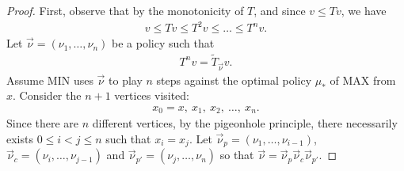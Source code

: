 \documentclass{article}
\begin{document}
\begin{proof}
  First, observe that by the monotonicity of $T$, and since $v \le Tv$, we have
  \begin{align}
    v \le Tv \le T^2 v \le \dots \le T^n v.
  \end{align}
  Let $\vec\nu=(\nu_1,\dots,\nu_n)$ be a policy such that
  \begin{align}
    T^n v = \tilde T_{\vec\nu} v.
  \end{align}
  Assume MIN uses $\vec\nu$ to play $n$ steps against the optimal policy $\mu_*$ of MAX from $x$. Consider the $n+1$ vertices visited:
  \begin{align}
    x_0=x,~ x_1,~ x_2,~ \dots,~ x_n.
  \end{align}
  Since there are $n$ different vertices, by the pigeonhole principle, there necessarily exists $0 \le i < j \le n$ such that $x_i=x_j$. Let $\vec\nu_p=(\nu_1,\dots,\nu_{i-1})$, $\vec\nu_c=(\nu_i,\dots,\nu_{j-1})$ and $\vec\nu_{p'}=(\nu_j,\dots,\nu_n)$ so that $\vec\nu=\vec\nu_p \vec\nu_c \vec\nu_{p'}$.
  

\end{proof}
\end{document}
